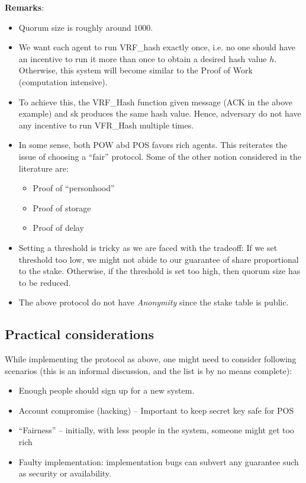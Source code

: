 \documentclass[twoside]{article}
\begin{document}
\textbf{Remarks}:
	\begin{itemize}
		\item Quorum size is roughly around $1000$.
		\item We want each agent to run VRF\_hash exactly once, i.e. no one should have an incentive to run it more than once to obtain a desired hash value $h$.
		Otherwise, this system will become similar to the Proof of Work (computation intensive).
		\item To achieve this, the VRF\_Hash function given message (ACK in the above example) and sk produces the same hash value. 
		Hence, adversary do not have any incentive to run VFR\_Hash multiple times.
		\item In some sense, both POW abd POS favors rich agents. This reiterates the issue of choosing a ``fair'' protocol.
		Some of the other notion considered in the literature are:
		\begin{itemize}
			\item Proof of ``personhood''
			\item Proof of storage
			\item Proof of delay
		\end{itemize}
		\item Setting a threshold is tricky as we are faced with the tradeoff: If we set threshold too low, we might not abide to 
		our guarantee of share proportional to the stake. Otherwise, if the threshold is set too high, then quorum size has to be reduced.
		\item The above protocol do not have \emph{Anonymity} since the stake table is public.
	\end{itemize}
	
\subsection{Practical considerations}
While implementing the protocol as above, one might need to consider following scenarios (this is an informal discussion, and the list is by no means complete):
\begin{itemize}
	\item Enough people should sign up for a new system.
	\item Account compromise (hacking) -- Important to keep secret key safe for POS
	\item ``Fairness'' -- initially, with less people in the system, someone might get too rich
	\item Faulty implementation: implementation bugs can subvert any guarantee such as security or availability.
\end{itemize}
\end{document}
